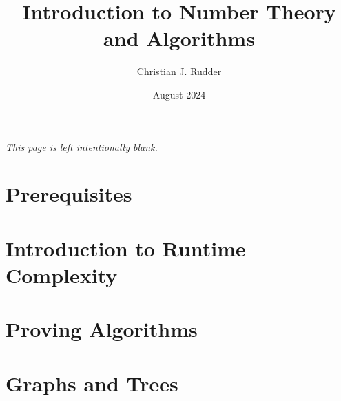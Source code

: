 \documentclass{memoir}
\title{Introduction to Number Theory and Algorithms}
\author{Christian J. Rudder}
\date{August 2024}
\begin{document}
\maketitle
\setcounter{tocdepth}{2}

\tableofcontents

\newpage
\thispagestyle{empty}
\mbox{}
\vfill
\begin{center}
    \textit{This page is left intentionally blank.}
\end{center}
\vfill
\newpage

\chapter*{Prerequisites}

\chapter{Introduction to Runtime Complexity}

\chapter{Proving Algorithms}


\chapter{Graphs and Trees}


\end{document}
